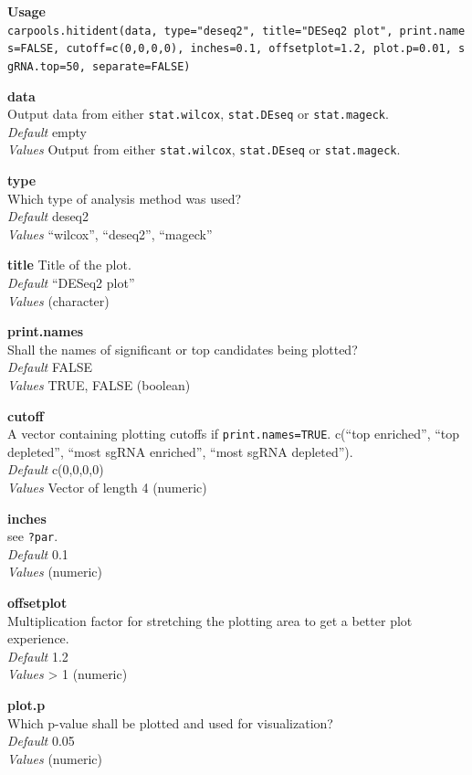 \documentclass[]{article}
\begin{document}
\textbf{Usage}\\
\texttt{carpools.hitident(data,\ type="deseq2",\ title="DESeq2\ plot",\ print.names=FALSE,\ cutoff=c(0,0,0,0),\ inches=0.1,\ offsetplot=1.2,\ plot.p=0.01,\ sgRNA.top=50,\ separate=FALSE)}

\textbf{data}\\
Output data from either \texttt{stat.wilcox}, \texttt{stat.DEseq} or
\texttt{stat.mageck}.\\
\emph{Default} empty\\
\emph{Values} Output from either \texttt{stat.wilcox},
\texttt{stat.DEseq} or \texttt{stat.mageck}.

\textbf{type}\\
Which type of analysis method was used?\\
\emph{Default} deseq2\\
\emph{Values} ``wilcox'', ``deseq2'', ``mageck''

\textbf{title} Title of the plot.\\
\emph{Default} ``DESeq2 plot''\\
\emph{Values} (character)

\textbf{print.names}\\
Shall the names of significant or top candidates being plotted?\\
\emph{Default} FALSE\\
\emph{Values} TRUE, FALSE (boolean)

\textbf{cutoff}\\
A vector containing plotting cutoffs if \texttt{print.names=TRUE}.
c(``top enriched'', ``top depleted'', ``most sgRNA enriched'', ``most
sgRNA depleted'').\\
\emph{Default} c(0,0,0,0)\\
\emph{Values} Vector of length 4 (numeric)

\textbf{inches}\\
see \texttt{?par}.\\
\emph{Default} 0.1\\
\emph{Values} (numeric)

\textbf{offsetplot}\\
Multiplication factor for stretching the plotting area to get a better
plot experience.\\
\emph{Default} 1.2\\
\emph{Values} \textgreater{} 1 (numeric)

\textbf{plot.p}\\
Which p-value shall be plotted and used for visualization?\\
\emph{Default} 0.05\\
\emph{Values} (numeric)
\end{document}
